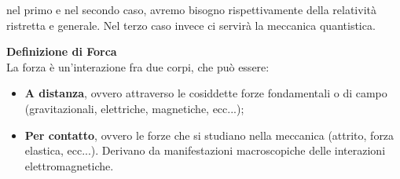 \documentclass[a4paper,12pt]{article}
\begin{document}
nel primo e nel secondo caso, avremo bisogno rispettivamente della relatività ristretta e generale. Nel terzo caso
invece ci servirà la meccanica quantistica.
\par\smallskip
\textbf{Definizione di Forca} \\
La forza è un'interazione fra due corpi, che può essere:
\begin{itemize}
  \item \textbf{A distanza}, ovvero attraverso le cosiddette forze fondamentali o di campo (gravitazionali, elettriche,
    magnetiche, ecc...);
  \item \textbf{Per contatto}, ovvero le forze che si studiano nella meccanica (attrito, forza elastica, ecc...). Derivano
    da manifestazioni macroscopiche delle interazioni elettromagnetiche.
\end{itemize}
\end{document}
